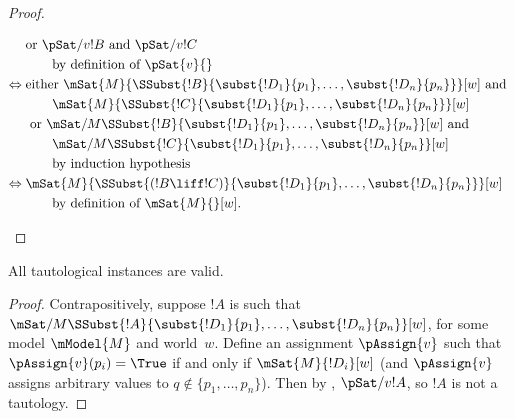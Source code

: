 \documentclass[../../../include/open-logic-section]{subfiles}
\begin{document}
\begin{proof}
\begin{enumerate}
{{\begin{align*}
        & \text{or } \pSat/{v}{!B} \text{ and } \pSat/{v}{!C}\\
        &\qquad \text{by definition of $\pSat{v}{}$}\\
        \Leftrightarrow {} &
        \text{either } \mSat{M}{\SSubst{!B}{\subst{!D_1}{p_1}, \dots,
            \subst{!D_n}{p_n}}}[w] \text{ and }\\
        & \qquad \mSat{M}{\SSubst{!C}{\subst{!D_1}{p_1}, \dots,
          \subst{!D_n}{p_n}}}[w]\\ 
        &  \text{ or } \mSat/{M}{\SSubst{!B}{\subst{!D_1}{p_1}, \dots,
            \subst{!D_n}{p_n}}}[w] \text{ and }\\
        & \qquad \mSat/{M}{\SSubst{!C}{\subst{!D_1}{p_1}, \dots,
          \subst{!D_n}{p_n}}}[w]\\
        &\qquad\text{by induction hypothesis}\\
        \Leftrightarrow {} &
        \mSat{M}{\SSubst{(!B \liff !C)}{\subst{!D_1}{p_1}, \dots,
          \subst{!D_n}{p_n}}}[w]\\
        &\qquad \text{by definition of $\mSat{M}{}[w]$}.
      \end{align*}}}{}
  \end{enumerate}
  \end{proof}

\begin{prop}
  All tautological instances are valid.
\end{prop}

\begin{proof}
  Contrapositively, suppose $!A$ is such that
  $\mSat/{M}{\SSubst{!A}{\subst{!D_1}{p_1}, \dots,
  \subst{!D_n}{p_n}}}[w]$, for some model $\mModel{M}$ and world~$w$.
  Define an assignment $\pAssign{v}$ such that $\pAssign{v}(p_i) =
  \True$ if and only if $\mSat{M}{!D_i}[w]$ (and $\pAssign{v}$ assigns
  arbitrary values to $q \notin \{p_1, \dots, p_n \}$).  Then by
  , $\pSat/{v}{!A}$, so $!A$ is not a tautology.
\end{proof}
\end{document}
